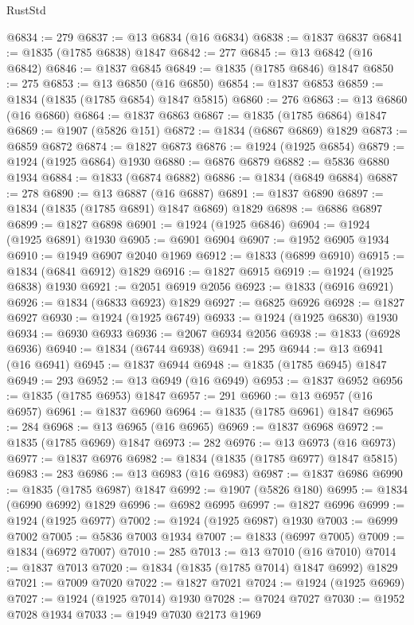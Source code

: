 \begin{lexlean}{RustStd}
\begin{coremodule}
{\begin{coremodule}
{{{{{@6834 := 279
@6837 := @13 @6834 (@16 @6834)
@6838 := @1837 @6837
@6841 := @1835 (@1785 @6838) @1847
@6842 := 277
@6845 := @13 @6842 (@16 @6842)
@6846 := @1837 @6845
@6849 := @1835 (@1785 @6846) @1847
@6850 := 275
@6853 := @13 @6850 (@16 @6850)
@6854 := @1837 @6853
@6859 := @1834 (@1835 (@1785 @6854) @1847 @5815)
@6860 := 276
@6863 := @13 @6860 (@16 @6860)
@6864 := @1837 @6863
@6867 := @1835 (@1785 @6864) @1847
@6869 := @1907 (@5826 @151)
@6872 := @1834 (@6867 @6869) @1829
@6873 := @6859 @6872
@6874 := @1827 @6873
@6876 := @1924 (@1925 @6854)
@6879 := @1924 (@1925 @6864) @1930
@6880 := @6876 @6879
@6882 := @5836 @6880 @1934
@6884 := @1833 (@6874 @6882)
@6886 := @1834 (@6849 @6884)
@6887 := 278
@6890 := @13 @6887 (@16 @6887)
@6891 := @1837 @6890
@6897 := @1834 (@1835 (@1785 @6891) @1847 @6869) @1829
@6898 := @6886 @6897
@6899 := @1827 @6898
@6901 := @1924 (@1925 @6846)
@6904 := @1924 (@1925 @6891) @1930
@6905 := @6901 @6904
@6907 := @1952 @6905 @1934
@6910 := @1949 @6907 @2040 @1969
@6912 := @1833 (@6899 @6910)
@6915 := @1834 (@6841 @6912) @1829
@6916 := @1827 @6915
@6919 := @1924 (@1925 @6838) @1930
@6921 := @2051 @6919 @2056
@6923 := @1833 (@6916 @6921)
@6926 := @1834 (@6833 @6923) @1829
@6927 := @6825 @6926
@6928 := @1827 @6927
@6930 := @1924 (@1925 @6749)
@6933 := @1924 (@1925 @6830) @1930
@6934 := @6930 @6933
@6936 := @2067 @6934 @2056
@6938 := @1833 (@6928 @6936)
@6940 := @1834 (@6744 @6938)
@6941 := 295
@6944 := @13 @6941 (@16 @6941)
@6945 := @1837 @6944
@6948 := @1835 (@1785 @6945) @1847
@6949 := 293
@6952 := @13 @6949 (@16 @6949)
@6953 := @1837 @6952
@6956 := @1835 (@1785 @6953) @1847
@6957 := 291
@6960 := @13 @6957 (@16 @6957)
@6961 := @1837 @6960
@6964 := @1835 (@1785 @6961) @1847
@6965 := 284
@6968 := @13 @6965 (@16 @6965)
@6969 := @1837 @6968
@6972 := @1835 (@1785 @6969) @1847
@6973 := 282
@6976 := @13 @6973 (@16 @6973)
@6977 := @1837 @6976
@6982 := @1834 (@1835 (@1785 @6977) @1847 @5815)
@6983 := 283
@6986 := @13 @6983 (@16 @6983)
@6987 := @1837 @6986
@6990 := @1835 (@1785 @6987) @1847
@6992 := @1907 (@5826 @180)
@6995 := @1834 (@6990 @6992) @1829
@6996 := @6982 @6995
@6997 := @1827 @6996
@6999 := @1924 (@1925 @6977)
@7002 := @1924 (@1925 @6987) @1930
@7003 := @6999 @7002
@7005 := @5836 @7003 @1934
@7007 := @1833 (@6997 @7005)
@7009 := @1834 (@6972 @7007)
@7010 := 285
@7013 := @13 @7010 (@16 @7010)
@7014 := @1837 @7013
@7020 := @1834 (@1835 (@1785 @7014) @1847 @6992) @1829
@7021 := @7009 @7020
@7022 := @1827 @7021
@7024 := @1924 (@1925 @6969)
@7027 := @1924 (@1925 @7014) @1930
@7028 := @7024 @7027
@7030 := @1952 @7028 @1934
@7033 := @1949 @7030 @2173 @1969
}}}}}
\end{coremodule}}
\end{coremodule}
\end{lexlean}
